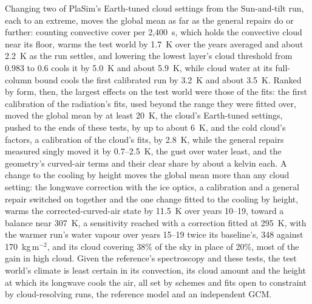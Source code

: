 Changing two of PlaSim's Earth-tuned cloud settings from the Sun-and-tilt run, each to an extreme, moves the global mean as far as the general repairs do or further:
counting convective cover per 2,400~s, which holds the convective cloud near its floor, warms the test world by
1.7~K over the years averaged and about 2.2~K as the run settles, and lowering the lowest layer's cloud threshold
from 0.983 to 0.6 cools it by 5.0~K and about 5.9~K, while cloud water at its full-column bound cools the first
calibrated run by 3.2~K and about 3.5~K. Ranked by form, then, the largest effects on the test world were those of the fits: the first calibration of the radiation's fits, used beyond the range they were
fitted over, moved the global mean by at least 20~K, the cloud's Earth-tuned settings, pushed to the ends of
these tests, by up to about 6~K, and the cold cloud's factors, a calibration of the cloud's fits, by 2.8~K, while
the general repairs measured singly moved it by 0.7--2.5~K, the gust over water least, and the geometry's
curved-air terms and their clear share by about a kelvin each. A change to the cooling by height moves the global mean more than any cloud setting: the longwave correction with the ice optics, a
calibration and a general repair switched on together and the one change fitted to the cooling by height, warms
the corrected-curved-air state by 11.5~K over years 10--19, toward a balance near 307~K, a sensitivity reached with a correction
fitted at 295~K, with the warmer run's water vapour over years 15--19 twice its baseline's, 348 against
170~kg\,m$^{-2}$, and its cloud covering 38\% of the sky in place of 20\%, most of the gain in high
cloud. Given the reference's spectroscopy and these tests, the test world's climate is least certain
in its convection, its cloud amount and the height at which its longwave cools the air, all set by schemes and fits
open to constraint by cloud-resolving runs, the reference model and an independent GCM.

